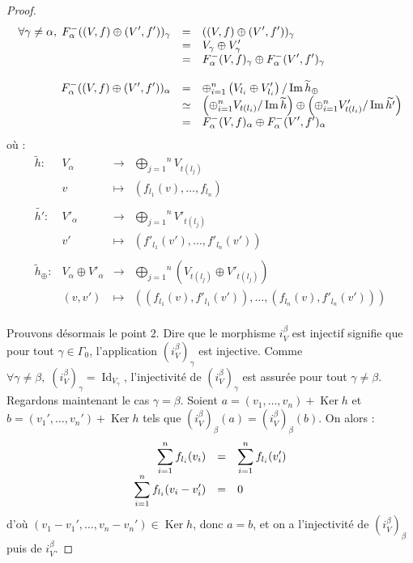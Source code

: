 \documentclass[a4paper,11pt]{article}
\DeclareMathOperator{\Ker}{Ker}
\DeclareMathOperator{\Id}{Id}
\DeclareMathOperator{\Img}{Im}
\newcommand{\dps}{\displaystyle}
\begin{document}
\begin{proof}
\[
\begin{array}{>{\dps}r>{\dps}l>{\dps}l}
	\forall\gamma\neq\alpha,\;F_{\alpha}^{-}((V,f)\oplus(V',f'))_{\gamma}&=&((V,f)\oplus(V',f'))_{\gamma}\\
	&=& V_{\gamma}\oplus V_{\gamma}'\\
	&=&  F_{\alpha}^{-}(V,f)_{\gamma}\oplus F_{\alpha}^{-}(V',f')_{\gamma}\\
	&&\\
	F_{\alpha}^{-}((V,f)\oplus(V',f'))_{\alpha}&=&\oplus_{i=1}^{n}\left(V_{l_{i}} \oplus V'_{l_{i}}\right)/ \Img \widetilde{h}_{\oplus} \\
	&\simeq& \left( \oplus_{i=1}^{n}V_{t(l_{i})} / \Img \widetilde{h} \right) \oplus  \left( \oplus_{i=1}^{n}V'_{t(l_{i})} / \Img \widetilde{h'} \right)\\
	&=&  F_{\alpha}^{-}(V,f)_{\alpha}\oplus F_{\alpha}^{-}(V',f')_{\alpha}\\
\end{array}
\] 
où :
\[
\begin{array}{lccc}
	\widetilde{h} : & V_{\alpha} &\rightarrow & \overset{n}{\underset{j=1}{\bigoplus}}V_{t(l_{j})} \\ 
	& v&\mapsto & \left(f_{l_{1}}(v), \dots, f_{l_{n}}\right)\\
	&&&\\
	\widetilde{h'} : & V'_{\alpha} &\rightarrow & \overset{n}{\underset{j=1}{\bigoplus}}V'_{t(l_{j})} \\ 
	& v'&\mapsto & \left(f'_{l_{1}}(v'), \dots, f'_{l_{n}}(v')\right)\\
	&&&\\
	\widetilde{h}_{\oplus} : &V_{\alpha} \oplus V'_{\alpha} &\rightarrow & \overset{n}{\underset{j=1}{\bigoplus}}(V_{t(l_{j})} \oplus V'_{t(l_{j})}) \\ 
	& (v,v') &\mapsto & \left((f_{l_{1}}(v),f'_{l_{1}}(v')), \dots, (f_{l_{n}}(v),f'_{l_{n}}(v'))\right)\\
\end{array}
	\]


	Prouvons désormais le point $2$. Dire que le morphisme $i_{V}^{\beta}$ est injectif signifie que pour tout $\gamma\in\Gamma_{0}$, l'application $(i_{V}^{\beta})_{\gamma}$ est injective. Comme $\forall\gamma\neq\beta,\;(i_{V}^{\beta})_{\gamma}=\Id_{V_{\gamma}}$, l'injectivité de $(i_{V}^{\beta})_{\gamma}$ est assurée pour tout $\gamma\neq\beta$. Regardons maintenant le cas $\gamma=\beta$. Soient $a=(v_{1},\dots,v_{n})+\Ker h$ et $b=(v_{1}',\dots,v_{n}')+\Ker h$ tels que $(i_{V}^{\beta})_{\beta}(a)=(i_{V}^{\beta})_{\beta}(b)$. On alors :
	\[
\begin{array}{>{\dps}r>{\dps}l>{\dps}l}
	\sum_{i=1}^{n}f_{l_{i}}(v_{i})&=&\sum_{i=1}^{n}f_{l_{i}}(v'_{i})\\
	\sum_{i=1}^{n}f_{l_{i}}(v_{i}-v_{i}')&=&0
\end{array}
	\]
	d'où $(v_{1}-v_{1}',\dots,v_{n}-v_{n}')\in\Ker h$, donc $a=b$, et on a l'injectivité de $(i_{V}^{\beta})_{\beta}$ puis de $i_{V}^{\beta}$.



\end{proof}
\end{document}
